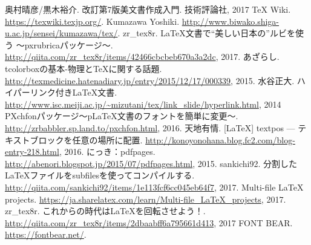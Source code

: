 
\begin{thebibliography}{99}
	奥村晴彦/黒木裕介.
	改訂第7版{\LaTeXe}美文書作成入門.
	技術評論社, 2017
	{\TeX} Wiki.
	\href{https://texwiki.texjp.org/}{https://texwiki.texjp.org/}.
	Kumazawa Yoshiki.
	\href{http://www.biwako.shiga-u.ac.jp/sensei/kumazawa/tex/}{http://www.biwako.shiga-u.ac.jp/sensei/kumazawa/tex/}.
	zr{\_}tex8r.
	LaTeX文書で“美しい日本の”ルビを使う ～pxrubricaパッケージ～.
	\href{http://qiita.com/zr_tex8r/items/42466cbcbeb670a3a2dc}{\url{http://qiita.com/zr_tex8r/items/42466cbcbeb670a3a2dc}}, 2017.
	あざらし.
	tcolorboxの基本-物理とTeXに関する話題.
	\href{http://texmedicine.hatenadiary.jp/entry/2015/12/17/000339}{http://texmedicine.hatenadiary.jp/entry/2015/12/17/000339}, 2015.
	水谷正大.
	ハイパーリンク付きLaTeX文書.
	\href{http://www.isc.meiji.ac.jp/~mizutani/tex/link_slide/hyperlink.html}{\url{http://www.isc.meiji.ac.jp/~mizutani/tex/link_slide/hyperlink.html}}, 2014
	PXchfonパッケージ～pLaTeX文書のフォントを簡単に変更～.
	\href{http://zrbabbler.sp.land.to/pxchfon.html}{http://zrbabbler.sp.land.to/pxchfon.html}, 2016.
	天地有情.
	[LaTeX] textpos --- テキストブロックを任意の場所に配置.
	\href{http://konoyonohana.blog.fc2.com/blog-entry-218.html}{http://konoyonohana.blog.fc2.com/blog-entry-218.html}, 2016.
	にっき：pdfpages.
	\href{http://abenori.blogspot.jp/2015/07/pdfpages.html}{http://abenori.blogspot.jp/2015/07/pdfpages.html}, 2015.
	sankichi92.
	分割したLaTeXファイルをsubfilesを使ってコンパイルする.
	\href{http://qiita.com/sankichi92/items/1e113fcf6cc045eb64f7}{http://qiita.com/sankichi92/items/1e113fcf6cc045eb64f7}, 2017.
	Multi-file LaTeX projects.
	\href{https://ja.sharelatex.com/learn/Multi-file_LaTeX_projects}{https://ja.sharelatex.com/learn/Multi-file_LaTeX_projects}, 2017.
	zr{\_}tex8r.
	これからの時代はLaTeXを回転させよう！.
	\href{http://qiita.com/zr_tex8r/items/2dbaabff6a795661d413}{\url{http://qiita.com/zr_tex8r/items/2dbaabff6a795661d413}}, 2017
	FONT BEAR.
	\href{https://fontbear.net/}{https://fontbear.net/}.
\end{thebibliography}

